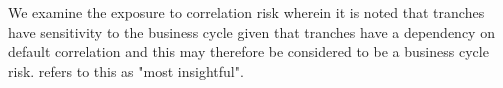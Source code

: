 We examine the exposure to correlation risk \cite{Gib2004} wherein it is noted that tranches have sensitivity to the business cycle given that tranches have a dependency on default correlation and this may therefore be considered to be a business cycle risk.  \cite{Gib2004} refers to this as "most insightful".

\begin{figure}
{}
{}

\end{figure}
